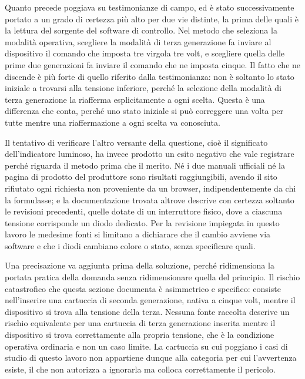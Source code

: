 Quanto precede poggiava su testimonianze di campo, ed è stato successivamente portato a un grado di certezza più alto per due vie distinte, la prima delle quali è la lettura del sorgente del software di controllo. Nel metodo che seleziona la modalità operativa, scegliere la modalità di terza generazione fa inviare al dispositivo il comando che imposta tre virgola tre volt, e scegliere quella delle prime due generazioni fa inviare il comando che ne imposta cinque. Il fatto che ne discende è più forte di quello riferito dalla testimonianza: non è soltanto lo stato iniziale a trovarsi alla tensione inferiore, perché la selezione della modalità di terza generazione la riafferma esplicitamente a ogni scelta. Questa è una differenza che conta, perché uno stato iniziale si può correggere una volta per tutte mentre una riaffermazione a ogni scelta va conosciuta.

Il tentativo di verificare l'altro versante della questione, cioè il significato dell'indicatore luminoso, ha invece prodotto un esito negativo che vale registrare perché riguarda il metodo prima che il merito. Né i due manuali ufficiali né la pagina di prodotto del produttore sono risultati raggiungibili, avendo il sito rifiutato ogni richiesta non proveniente da un browser, indipendentemente da chi la formulasse; e la documentazione trovata altrove descrive con certezza soltanto le revisioni precedenti, quelle dotate di un interruttore fisico, dove a ciascuna tensione corrisponde un diodo dedicato. Per la revisione impiegata in questo lavoro le medesime fonti si limitano a dichiarare che il cambio avviene via software e che i diodi cambiano colore o stato, senza specificare quali.

Una precisazione va aggiunta prima della soluzione, perché ridimensiona la portata pratica della domanda senza ridimensionare quella del principio. Il rischio catastrofico che questa sezione documenta è asimmetrico e specifico: consiste nell'inserire una cartuccia di seconda generazione, nativa a cinque volt, mentre il dispositivo si trova alla tensione della terza. Nessuna fonte raccolta descrive un rischio equivalente per una cartuccia di terza generazione inserita mentre il dispositivo si trova correttamente alla propria tensione, che è la condizione operativa ordinaria e non un caso limite. La cartuccia su cui poggiano i casi di studio di questo lavoro non appartiene dunque alla categoria per cui l'avvertenza esiste, il che non autorizza a ignorarla ma colloca correttamente il pericolo.

